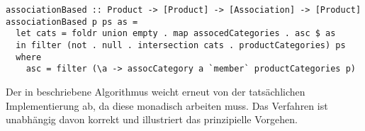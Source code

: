 \begin{lstlisting}[label=code:ab-suggestions,caption={Algorithmus zur Generierung association-basierter Produktempfehlungen}]
associationBased :: Product -> [Product] -> [Association] -> [Product]
associationBased p ps as =
  let cats = foldr union empty . map assocedCategories . asc $ as
  in filter (not . null . intersection cats . productCategories) ps
  where
    asc = filter (\a -> assocCategory a `member` productCategories p)
\end{lstlisting}
Der in  beschriebene Algorithmus weicht erneut von der tatsächlichen Implementierung ab, da diese monadisch arbeiten muss. Das Verfahren ist unabhängig davon korrekt und illustriert das prinzipielle Vorgehen.